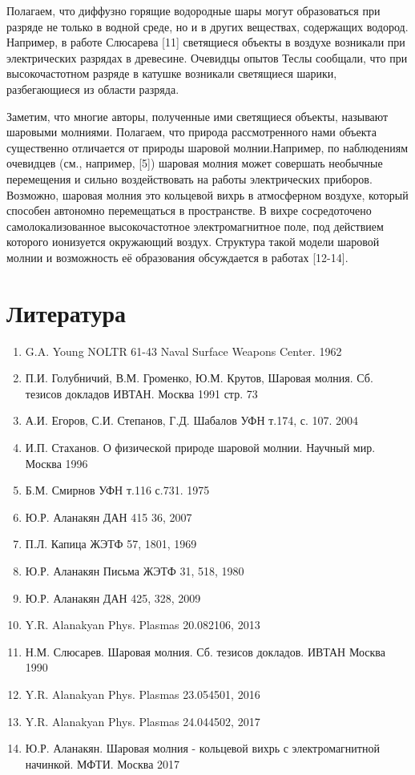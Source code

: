 \documentclass[a4paper]{article}
\begin{document}
Полагаем, что диффузно горящие водородные шары могут образоваться при разряде не только в водной среде, но и в других веществах, содержащих водород. Например, в работе Слюсарева [11] светящиеся объекты в воздухе возникали при электрических разрядах в древесине. Очевидцы опытов Теслы сообщали, что при высокочастотном разряде в катушке возникали светящиеся шарики, разбегающиеся из области разряда.

Заметим, что многие авторы, полученные ими светящиеся объекты, называют шаровыми молниями. Полагаем, что природа рассмотренного нами объекта существенно отличается от природы шаровой молнии.Например, по наблюдениям очевидцев (см., например, [5]) шаровая молния может совершать необычные перемещения и сильно воздействовать на работы электрических приборов. Возможно, шаровая молния это кольцевой вихрь в атмосферном воздухе, который способен автономно перемещаться в пространстве. В вихре сосредоточено самолокализованное высокочастотное электромагнитное поле, под действием которого ионизуется окружающий воздух. Структура такой модели шаровой молнии и возможность её образования обсуждается в работах [12-14]. 

\newpage
\section{Литература}
\begin{enumerate}
    \item G.A. Young NOLTR 61-43 Naval Surface Weapons Center. 1962
    \item П.И. Голубничий, В.М. Громенко, Ю.М. Крутов, Шаровая молния. Сб. тезисов докладов ИВТАН. Москва 1991 стр. 73
    \item А.И. Егоров, С.И. Степанов, Г.Д. Шабалов УФН т.174, с. 107. 2004
    \item И.П. Стаханов. О физической природе шаровой молнии. Научный мир. Москва 1996
    \item Б.М. Смирнов УФН т.116 с.731. 1975
    \item Ю.Р. Аланакян ДАН 415 36, 2007
    \item П.Л. Капица ЖЭТФ 57, 1801, 1969
    \item Ю.Р. Аланакян Письма ЖЭТФ 31, 518, 1980
    \item Ю.Р. Аланакян ДАН 425, 328, 2009
    \item Y.R. Alanakyan Phys. Plasmas 20.082106, 2013
    \item Н.М. Слюсарев. Шаровая молния. Сб. тезисов докладов. ИВТАН Москва 1990
    \item Y.R. Alanakyan Phys. Plasmas 23.054501, 2016
    \item Y.R. Alanakyan Phys. Plasmas 24.044502, 2017
    \item Ю.Р. Аланакян. Шаровая молния - кольцевой вихрь с электромагнитной начинкой. МФТИ. Москва 2017
    
    
\end{enumerate}

 
\end{document}
